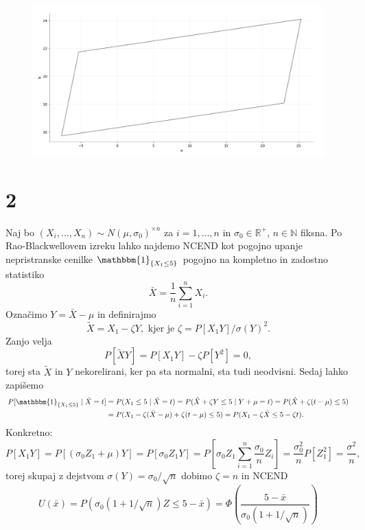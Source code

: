 \documentclass[ letterpaper, titlepage, fleqn]{article}
\newcommand{\R}{\mathbb R}
\newcommand{\N}{\mathbb N}
\newcommand{\ind}{\mathbbm{1}}
\begin{document}
\begin{center}
\begin{figure}[h]
\begin{center}
\includegraphics[width=15cm]{graphics/ConfidenceParalelogram.png}
\end{center}
\end{figure}
\end{center}


\section{2}
Naj bo $(X_i, \dots, X_n) \sim N(\mu, \sigma_0)^{\times n}$ za $i=1,\dots,n$ in $\sigma_0 \in \R^+$, $n\in\N$ fiksna. Po Rao-Blackwellovem izreku lahko najdemo NCEND kot pogojno upanje nepristranske cenilke $\ind_{\{X_1 \leq 5\}}$  pogojno na kompletno in zadostno statistiko
$$\bar{X} = \frac{1}{n} \sum_{i=1}^n X_i.$$
Označimo $Y = \bar{X} - \mu$ in definirajmo
$$\tilde{X} = X_1 - \zeta Y, \text{ kjer je } \zeta = P[X_1Y] / \sigma(Y)^2.$$
Zanjo velja
$$P[\tilde{X}Y] = P[X_1Y] - \zeta P[Y^2] = 0,$$
torej sta $\tilde{X}$ in $Y$ nekorelirani, ker pa sta normalni, sta tudi neodvisni. 
Sedaj lahko zapišemo
\begin{equation*}
\begin{aligned}
P[\ind_{\{X_1 \leq 5\}} \mid \bar{X} = t] &= P(X_1 \leq 5 \mid \bar{X} = t) 
= P(\tilde{X} + \zeta Y \leq 5 \mid Y + \mu = t) = P(\tilde{X} + \zeta (t - \mu) \leq 5) \\
&= P(X_1 - \zeta (\bar{X} - \mu) + \zeta(t - \mu) \leq 5) = P(X_1 - \zeta \bar{X} \leq 5 - \zeta t).
\end{aligned}
\end{equation*}
Konkretno:
\begin{equation*}
P[X_1Y] = P[(\sigma_0 Z_1 + \mu)Y] = P[\sigma_0 Z_1 Y] = P[\sigma_0 Z_1 \sum_{i=1}^n \frac{\sigma_0}{n} Z_i] = \frac{\sigma_0^2}{n} P[Z_1^2]  = \frac{\sigma^2}{n},
\end{equation*}
torej skupaj z dejstvom $\sigma(Y) = \sigma_0 / \sqrt{n}$ dobimo $\zeta = n$ in NCEND
$$U(\bar{x}) = P(\sigma_0 (1 + 1/\sqrt{n})Z \leq 5 - \bar{x}) = \Phi\left(\frac{5 - \bar{x}}{\sigma_0(1 + 1/\sqrt{n})}\right)$$
\end{document}
